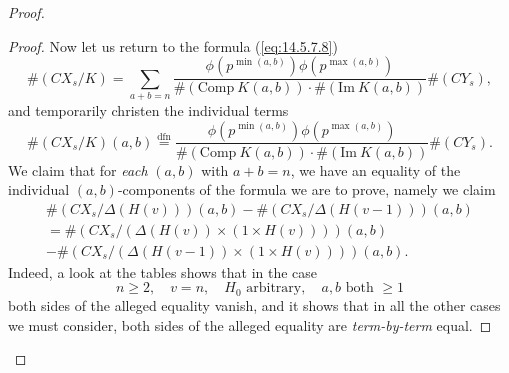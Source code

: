 \begin{proof}
\begin{proof}
Now let us return to the formula (\ref{eq:14.5.7.8})
\[
\#(CX_s / K) = \sum_{a+b=n} \frac{\phi(p^{\min(a,b)}) \phi(p^{\max(a,b)})}{\#(\mathrm{Comp}\ K(a,b)) \cdot \#(\mathrm{Im}\ K(a,b))} \#(CY_s) ,
\]
and temporarily christen the individual terms
\setcounter{equation}{12}%
\begin{equation}\label{eq:14.5.7.13}
\#(CX_s / K)(a,b) \overset{\mathrm{dfn}}{=} \frac{\phi(p^{\min(a,b)}) \phi(p^{\max(a,b)})}{\#(\mathrm{Comp}\ K(a,b)) \cdot \#(\mathrm{Im}\ K(a,b))} \#(CY_s) .
\end{equation}
We claim that for \emph{each} $(a,b)$ with $a+b=n$, we have an equality of the individual $(a,b)$-components of the formula we are to prove, namely we claim
\begin{multline}\label{eq:14.5.7.14}
\#(CX_s / \Delta(H(v)))(a,b) - \#(CX_s / \Delta(H(v-1)))(a,b) \\
= \#(CX_s / (\Delta(H(v)) \times (1 \times H(v))))(a,b) \\
- \#(CX_s / (\Delta(H(v-1)) \times (1 \times H(v))))(a,b) .
\end{multline}
Indeed, a look at the tables shows that in the case
\[
n \ge 2, \quad v = n, \quad H_0 \text{ arbitrary}, \quad a, b \text{ both } \ge 1
\]
both sides of the alleged equality vanish, and it shows that in all the other cases we must consider, both sides of the alleged equality are \emph{term-by-term} equal.
\end{proof}


\end{proof}
